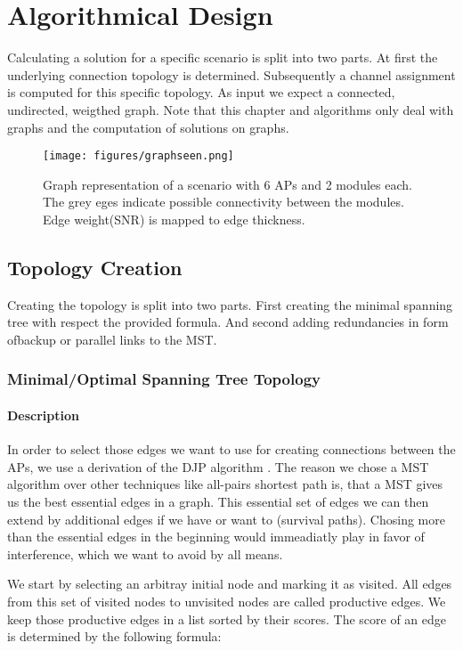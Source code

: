 \chapter{Algorithmical Design}
  Calculating a solution for a specific scenario is split into two parts. At first the underlying connection topology is determined.
  Subsequently a channel assignment is computed for this specific topology. As input we expect a connected, undirected, weigthed graph.
  Note that this chapter and algorithms only deal with graphs and the computation of solutions on graphs.
  
  \begin{figure}[htbp]
    \centering
    \texttt{[image: figures/graphseen.png]}
    \caption{Graph representation of a scenario with 6 APs and 2 modules each. The grey eges indicate possible connectivity between the 
      modules. Edge weight(SNR) is mapped to edge thickness.}
    \label{fig:graphseen}
  \end{figure}
  
  \section{Topology Creation}
    Creating the topology is split into two parts. 
    First creating the minimal spanning tree with respect the provided formula.
    And second adding redundancies in form ofbackup or parallel links to the \ac{MST}.    

    \subsection{Minimal/Optimal Spanning Tree Topology}
      \subsubsection{Description}
	In order to select those edges we want to use for creating connections between the APs, we use a derivation of the \ac{DJP} algorithm \cite{prim}\cite{jarnik}.
	The reason we chose a \ac{MST} algorithm over other techniques like all-pairs shortest path is, that a MST gives us the best essential edges in a graph. 
	This essential set of edges we can then extend by additional edges if we have or want to (survival paths). 
	Chosing more than the essential edges in the beginning would immeadiatly play in favor of interference, which we want to avoid by all means.      
	
	We start by selecting an arbitray initial node and marking it as visited. All edges from this set of visited nodes to unvisited nodes are called productive edges.
	We keep those productive edges in a list sorted by their scores. The score of an edge is determined by the following formula:
	
